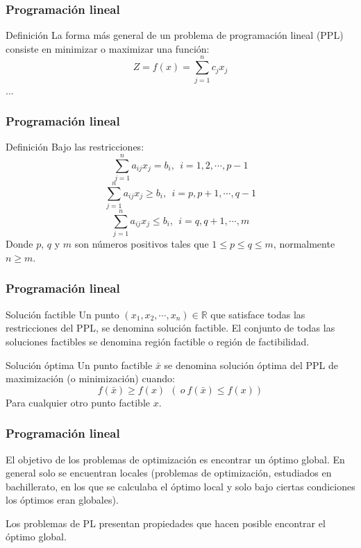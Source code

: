 \documentclass{beamer}
\begin{document}
\begin{frame}
\frametitle{Programaci\'on lineal}
\begin{block}{Definici\'on}
La forma m\'as general de un problema de programaci\'on lineal (PPL) consiste en minimizar o maximizar una funci\'on:
\[Z=f(x) = \sum_{j=1}^n c_jx_j\]
...
\end{block}
\end{frame}


\begin{frame}
\frametitle{Programaci\'on lineal}
\begin{block}{Definici\'on}
Bajo las restricciones:
\[\sum_{j=1}^na_{ij}x_j=b_i,\ \ i=1, 2, \cdots, p-1\]
\[\sum_{j=1}^na_{ij}x_j\geq b_i,\ \ i=p, p+1, \cdots, q-1\]
\[\sum_{j=1}^na_{ij}x_j\leq b_i,\ \ i=q, q+1, \cdots, m\]
Donde $p$, $q$ y $m$ son n\'umeros positivos tales que $1\leq p \leq q\leq m$, normalmente $n\geq m$.
\end{block}
\end{frame}

\begin{frame}
\frametitle{Programaci\'on lineal}
\begin{block}{Soluci\'on factible}
Un punto $(x_1,x_2,\cdots, x_n)\in \mathbb R$ que satisface todas las restricciones del PPL, se denomina soluci\'on factible. El conjunto de todas las soluciones factibles se denomina regi\'on factible o regi\'on de factibilidad.
\end{block}

\begin{block}{Soluci\'on \'optima}
Un punto factible $\bar x$ se denomina soluci\'on \'optima del PPL de maximizaci\'on (o minimizaci\'on) cuando:
\[f(\bar x)\geq f(x) \ \ (\ o \ f(\bar x) \leq f(x))\]
Para cualquier otro punto factible $x$.
\end{block}
\end{frame}



\begin{frame}
\frametitle{Programaci\'on lineal}
El objetivo de los problemas de optimizaci\'on es encontrar un \'optimo global. En general solo se encuentran locales (problemas de optimizaci\'on, estudiados en bachillerato, en los que se calculaba el \'optimo local y solo bajo ciertas condiciones los \'optimos eran globales).

Los problemas de PL presentan propiedades que hacen posible encontrar el \'optimo global.
\end{frame}
\end{document}
